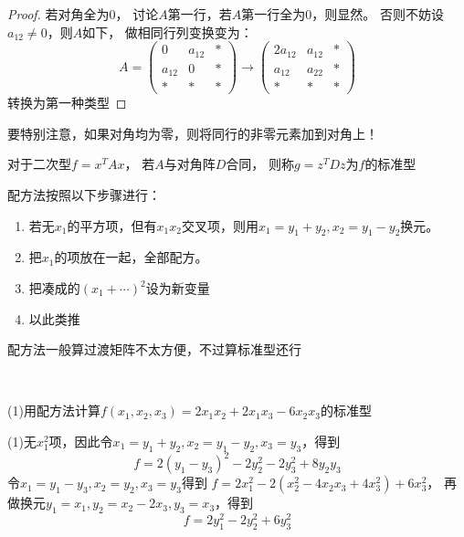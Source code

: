 \begin{proof}
  若对角全为$0$，
  讨论$A$第一行，若$A$第一行全为$0$，则显然。
  否则不妨设$a_{12} \neq 0$，则$A$如下，
  做相同行列变换变为：
  \begin{equation*}
    A = \left(
      \begin{array}{ccc}
        0&a_{12}&\ast \\
         a_{12}&0&\ast \\
         \ast&\ast&\ast
      \end{array}
    \right) \rightarrow \left(
      \begin{array}{ccc}
        2a_{12}&a_{12}&\ast\\
        a_{12}&a_{22}&\ast\\
        \ast&\ast&\ast
      \end{array}
    \right)
  \end{equation*}
  转换为第一种类型
\end{proof}

\begin{note}
  要特别注意，如果对角均为零，则将同行的非零元素加到对角上！
\end{note}


\begin{definition}[二次型标准型]
  对于二次型$f = x^TAx$，
  若$A$与对角阵$D$合同，
  则称$g = z^T Dz$为$f$的标准型
\end{definition}

\begin{theorem}[配方法]
  配方法按照以下步骤进行：
  \begin{enumerate}
  \item 若无$x_1$的平方项，但有$x_1x_2$交叉项，则用$x_1 = y_1 + y_2,x_2 = y_1 - y_2$换元。
  \item 把$x_1$的项放在一起，全部配方。
  \item 把凑成的$(x_1 + \cdots)^2$设为新变量
  \item 以此类推
  \end{enumerate}
\end{theorem}

\begin{note}
  配方法一般算过渡矩阵不太方便，不过算标准型还行
\end{note}

~

\begin{exercise}[配方法]
  (1)用配方法计算$f(x_1,x_2,x_3) = 2x_1x_2 + 2x_1x_3 - 6x_2x_3$的标准型
\end{exercise}

\begin{solution}
  (1)无$x_1^2$项，因此令$x_1 = y_1 + y_2, x_2 = y_1 - y_2, x_3 = y_3$，得到
  \begin{equation*}
    f = 2(y_1 - y_3)^2 - 2y_2^2 - 2y_3^2 + 8y_2y_3
  \end{equation*}
  令$x_1 = y_1 - y_3, x_2 = y_2, x_3 = y_3$得到
  $f = 2x_1^2 - 2(x_2^2 - 4x_2x_3 + 4x_3^2) + 6x_3^2$，
  再做换元$y_1 = x_1, y_2 = x_2 - 2x_3, y_3 = x_3$，得到
  \begin{equation*}
    f = 2y_1^2 - 2y_2^2 + 6y_3^2
  \end{equation*}
\end{solution}


